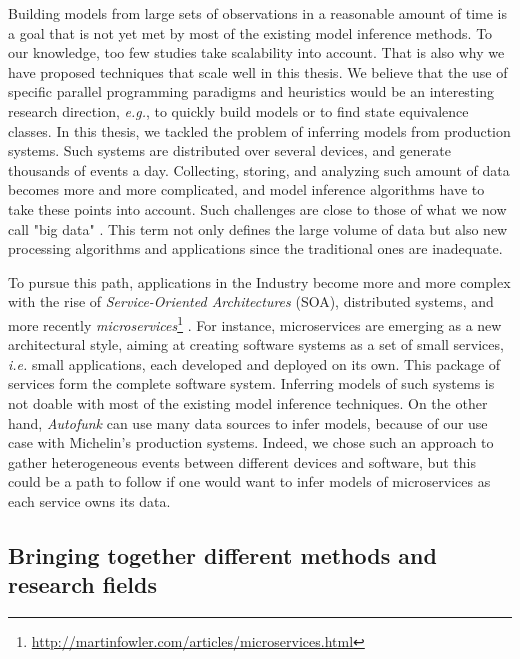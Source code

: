 Building models from large sets of observations in a reasonable
amount of time is a goal that is not yet met by most of the
existing model inference methods. To our knowledge, too few
studies \cite{Yang:2006:PMT:1134285.1134325,Pradel:2009} take
scalability into account. That is also why we have proposed
techniques that scale well in this thesis. We believe that the
use of specific parallel programming paradigms and heuristics
would be an interesting research direction, \emph{e.g.}, to
quickly build models or to find state equivalence classes. In
this thesis, we tackled the problem of inferring models from
production systems.  Such systems are distributed over several
devices, and generate thousands of events a day. Collecting,
storing, and analyzing such amount of data becomes more and more
complicated, and model inference algorithms have to take these
points into account. Such challenges are close to those of what
we now call "big data" \cite{bigdata14}. This term not only
defines the large volume of data but also new processing
algorithms and applications since the traditional ones are
inadequate.

To pursue this path, applications in the Industry become more and
more complex with the rise of \emph{Service-Oriented
Architectures} (SOA), distributed systems, and more recently
\emph{microservices}\footnote{\url{http://martinfowler.com/articles/microservices.html}}
\cite{thones2015microservices}.  For instance, microservices are
emerging as a new architectural style, aiming at creating
software systems as a set of small services, \emph{i.e.} small
applications, each developed and deployed on its own. This
package of services form the complete software system. Inferring
models of such systems is not doable with most of the existing
model inference techniques. On the other hand, \textit{Autofunk}
can use many data sources to infer models, because of our use
case with Michelin's production systems. Indeed, we chose such an
approach to gather heterogeneous events between different devices
and software, but this could be a path to follow if one would
want to infer models of microservices as each service owns its
data.

\subsection{Bringing together different methods and research
fields}

